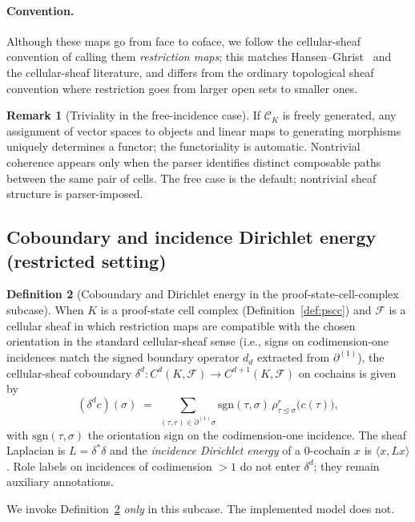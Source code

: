 \documentclass[11pt]{article}
\theoremstyle{definition}
\newtheorem{definition}{Definition}[section]
\newtheorem{remark}[definition]{Remark}
\theoremstyle{plain}
\newcommand{\sgn}{\mathrm{sgn}}
\newcommand{\catK}{\mathcal{C}_K}
\begin{document}
\paragraph{Convention.} Although these maps go from face to coface, we follow the cellular-sheaf convention of calling them \emph{restriction maps}; this matches Hansen--Ghrist~\cite{hansenghrist2019} and the cellular-sheaf literature, and differs from the ordinary topological sheaf convention where restriction goes from larger open sets to smaller ones.

\begin{remark}[Triviality in the free-incidence case]\label{rem:free-quiver}
If $\catK$ is freely generated, any assignment of vector spaces to objects and linear maps to generating morphisms uniquely determines a functor; the functoriality is automatic. Nontrivial coherence appears only when the parser identifies distinct composable paths between the same pair of cells. The free case is the default; nontrivial sheaf structure is parser-imposed.
\end{remark}

\subsection{Coboundary and incidence Dirichlet energy (restricted setting)}

\begin{definition}[Coboundary and Dirichlet energy in the proof-state-cell-complex subcase]\label{def:dirichlet}
When $K$ is a proof-state cell complex (Definition~\ref{def:pscc}) and $\mathcal{F}$ is a cellular sheaf in which restriction maps are compatible with the chosen orientation in the standard cellular-sheaf sense (i.e., signs on codimension-one incidences match the signed boundary operator $d_d$ extracted from $\partial^{(1)}$), the cellular-sheaf coboundary $\delta^d\colon C^d(K, \mathcal{F}) \to C^{d+1}(K, \mathcal{F})$ on cochains is given by
\[
(\delta^d c)(\sigma) \;=\; \sum_{(\tau, r) \in \partial^{(1)} \sigma} \sgn(\tau, \sigma)\,\rho^r_{\tau \trianglelefteq \sigma}\bigl(c(\tau)\bigr),
\]
with $\sgn(\tau, \sigma)$ the orientation sign on the codimension-one incidence. The sheaf Laplacian is $L = \delta^* \delta$ and the \emph{incidence Dirichlet energy} of a $0$-cochain $x$ is $\langle x, Lx \rangle$. Role labels on incidences of codimension $>1$ do not enter $\delta^d$; they remain auxiliary annotations.
\end{definition}

We invoke Definition~\ref{def:dirichlet} \emph{only} in this subcase. The implemented model does not.
\end{document}
